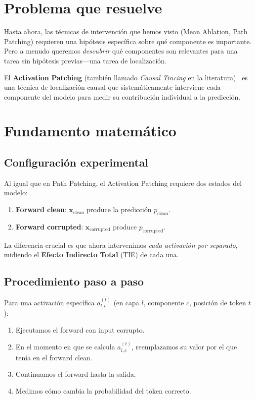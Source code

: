 \documentclass[11pt,a4paper]{report}
\theoremstyle{definition}
\begin{document}
\section{Problema que resuelve}

Hasta ahora, las técnicas de intervención que hemos visto (Mean Ablation, Path Patching) requieren una hipótesis específica sobre qué componente es importante. Pero a menudo queremos \emph{descubrir} qué componentes son relevantes para una tarea sin hipótesis previas---una tarea de localización.

El \textbf{Activation Patching} (también llamado \emph{Causal Tracing} en la literatura)~\cite{meng2022rome} es una técnica de localización causal que sistemáticamente interviene cada componente del modelo para medir su contribución individual a la predicción.

\section{Fundamento matemático}

\subsection{Configuración experimental}

Al igual que en Path Patching, el Activation Patching requiere dos estados del modelo:

\begin{enumerate}
    \item \textbf{Forward clean}: $\mathbf{x}_{\text{clean}}$ produce la predicción $p_{\text{clean}}$.
    \item \textbf{Forward corrupted}: $\mathbf{x}_{\text{corrupted}}$ produce $p_{\text{corrupted}}$.
\end{enumerate}

La diferencia crucial es que ahora intervenimos \emph{cada activación por separado}, midiendo el \textbf{Efecto Indirecto Total} (TIE) de cada una.

\subsection{Procedimiento paso a paso}

Para una activación específica $a_{l,c}^{(t)}$ (en capa $l$, componente $c$, posición de token $t$):

\begin{enumerate}
    \item Ejecutamos el forward con input corrupto.
    \item En el momento en que se calcula $a_{l,c}^{(t)}$, reemplazamos su valor por el que tenía en el forward clean.
    \item Continuamos el forward hasta la salida.
    \item Medimos cómo cambia la probabilidad del token correcto.
\end{enumerate}
\end{document}
